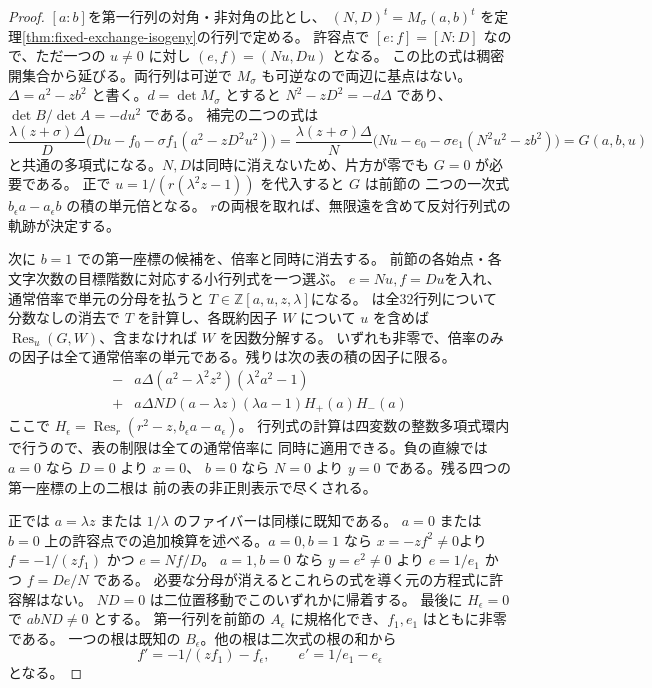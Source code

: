 \begin{proof}
$[a:b]$を第一行列の対角・非対角の比とし、
$(N,D)^t=M_\sigma(a,b)^t$ を定理\ref{thm:fixed-exchange-isogeny}の行列で定める。
許容点で $[e:f]=[N:D]$ なので、ただ一つの $u\ne0$ に対し $(e,f)=(Nu,Du)$ となる。
この比の式は稠密開集合から延びる。両行列は可逆で $M_\sigma$ も可逆なので両辺に基点はない。
$\Delta=a^2-zb^2$ と書く。$d=\det M_\sigma$ とすると
$N^2-zD^2=-d\Delta$ であり、$\det B/\det A=-d u^2$ である。
補完の二つの式は
\[
 \frac{\lambda(z+\sigma)\Delta}{D}
 \bigl(Du-f_0-\sigma f_1(a^2-zD^2u^2)\bigr)
 =
 \frac{\lambda(z+\sigma)\Delta}{N}
 \bigl(Nu-e_0-\sigma e_1(N^2u^2-zb^2)\bigr)
 =G(a,b,u)
\]
と共通の多項式になる。$N,D$は同時に消えないため、片方が零でも $G=0$ が必要である。
正で $u=1/(r(\lambda^2z-1))$ を代入すると $G$ は前節の
二つの一次式 $b_\epsilon a-a_\epsilon b$ の積の単元倍となる。
$r$の両根を取れば、無限遠を含めて反対行列式の軌跡が決定する。

次に $b=1$ での第一座標の候補を、倍率と同時に消去する。
前節の各始点・各文字次数の目標階数に対応する小行列式を一つ選ぶ。
$e=Nu,f=Du$を入れ、通常倍率で単元の分母を払うと
$T\in\mathbb Z[a,u,z,\lambda]$になる。
 は全32行列について
分数なしの消去で $T$ を計算し、各既約因子 $W$ について
$u$ を含めば $\operatorname{Res}_u(G,W)$、含まなければ $W$ を因数分解する。
いずれも非零で、倍率のみの因子は全て通常倍率の単元である。残りは次の表の積の因子に限る。
\[
\begin{array}{c|l}
 - & a\Delta(a^2-\lambda^2z^2)(\lambda^2a^2-1)\\
 + & a\Delta ND(a-\lambda z)(\lambda a-1) H_+(a)H_-(a)
\end{array}
\]
ここで $H_\epsilon=\operatorname{Res}_r(r^2-z,b_\epsilon a-a_\epsilon)$。
行列式の計算は四変数の整数多項式環内で行うので、表の制限は全ての通常倍率に
同時に適用できる。負の直線では $a=0$ なら $D=0$ より $x=0$、
$b=0$ なら $N=0$ より $y=0$ である。残る四つの第一座標の上の二根は
前の表の非正則表示で尽くされる。

正では $a=\lambda z$ または $1/\lambda$ のファイバーは同様に既知である。
$a=0$ または $b=0$ 上の許容点での追加検算を述べる。$a=0,b=1$ なら
$x=-zf^2\ne0$より $f=-1/(zf_1)$ かつ $e=Nf/D$。
$a=1,b=0$ なら $y=e^2\ne0$ より $e=1/e_1$ かつ $f=De/N$ である。
必要な分母が消えるとこれらの式を導く元の方程式に許容解はない。
$ND=0$ は二位置移動でこのいずれかに帰着する。
最後に $H_\epsilon=0$ で $abND\ne0$ とする。
第一行列を前節の $A_\epsilon$ に規格化でき、$f_1,e_1$ はともに非零である。
一つの根は既知の $B_\epsilon$。他の根は二次式の根の和から
\[
 f'=-1/(zf_1)-f_\epsilon,\qquad e'=1/e_1-e_\epsilon
\]
となる。


\end{proof}
